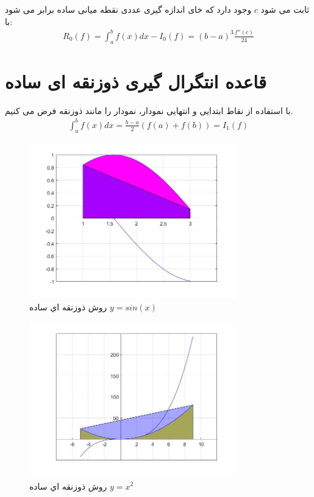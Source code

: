 \documentclass{article}
\begin{document}
 ثابت می شود $c$
وجود دارد که خای اندازه گیری عددی نقطه میانی ساده برابر می شود با:
\\
\begin{align*}
    R_{0}(f) = \int_a^{b} f(x) dx - I_{0}(f) = (b-a)^3\frac{f''(c)}{24}
\end{align*}



\section{قاعده انتگرال گیری ذوزنقه ای ساده}
با استفاده از نقاط ابتدایی و انتهایی نمودار، 
نمودار را مانند ذوزنقه فرض می کنیم.
\\
\begin{align*}
    \int_{a}^b f(x) dx = \frac{b-a}{2}(f(a) + f(b)) = I_{1}(f)
\end{align*}


\begin{figure}[!h]
    \centering
\includegraphics[width=9cm]{pic32codeIntegral.jpg}
    \caption{ روش ذوزنقه اي ساده $y=sin(x)$ }
    \label{fig:انتگرال خط}
\end{figure}

\begin{figure}[!h]
    \centering
\includegraphics[width=9cm]{pic33codeIntegral.jpg}
    \caption{ روش ذوزنقه اي ساده $y=x^2$ }
    \label{fig:انتگرال خط}
\end{figure}
\end{document}
